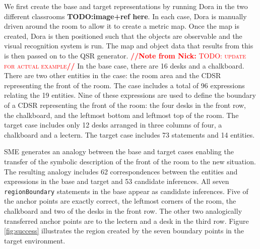 \documentclass[letterpaper]{article}
\newcommand{\from}[2]{\textcolor{red}{\noindent\textbf{//}\textbf{Note
      from #1:}\textsc{ #2}\textbf{//}}}
\newcommand{\fw}[1]{\texttt{#1}}
\begin{document}
We first create the base and target representations by running Dora in the two different classrooms \textbf{TODO:image+ref here}. In each case, Dora is manually driven around the room to allow it to create a metric map. Once the map is created, Dora is then positioned such that the objects are observable and the visual recognition system is run. The map and object data that results from this is then passed on to the QSR generator. \from{Nick}{TODO: update for actual example} In the base case, there are 16 desks and a chalkboard. There are two other entities in the case: the room area and the CDSR representing the front of the room. The case includes a total of 96 expressions relating the 19 entities. Nine of these expressions are used to define the boundary of a CDSR representing the front of the room: the four desks in the front row, the chalkboard, and the leftmost bottom and leftmost top of the room. The target case includes only 12 desks arranged in three columns of four, a chalkboard and a lectern. The target case includes 73 statements and 14 entities.

SME generates an analogy between the base and target cases enabling the transfer of the symbolic description of the front of the room to the new situation. The resulting analogy includes 62 correspondences between the entities and expressions in the base and target and 53 candidate inferences.  All seven \fw{regionBoundary} statements in the base appear as candidate inferences. Five of the anchor points are exactly correct, the leftmost corners of the room, the chalkboard and two of the desks in the front row. The other two analogically transferred anchor points are to the lectern and a desk in the third row. Figure \ref{fig:success} illustrates the region created by the seven boundary points in the target environment. 

\end{document}

